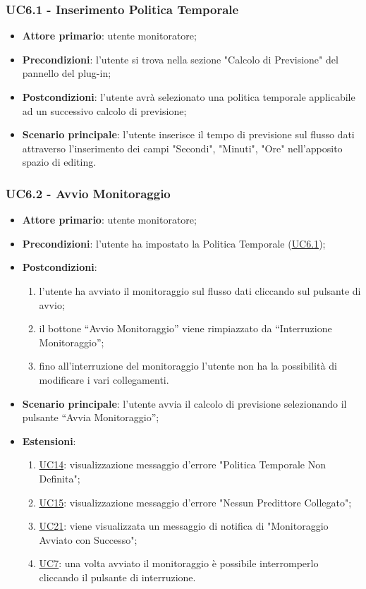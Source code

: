 	
	\label{par:UC6.1}
	\subsubsection{UC6.1 - Inserimento Politica Temporale}
		\begin{itemize}
			\item\textbf{Attore primario}: utente monitoratore;
			\item\textbf{Precondizioni}: l'utente si trova nella sezione "Calcolo di Previsione" del pannello del plug-in;
			\item\textbf{Postcondizioni}: l’utente avrà selezionato una politica temporale applicabile ad un successivo calcolo di previsione;
			\item\textbf{Scenario principale}: l’utente inserisce il tempo di previsione sul flusso dati attraverso l'inserimento dei campi "Secondi", "Minuti", "Ore" nell’apposito spazio di editing.
		\end{itemize}	

	\label{par:UC6.2}
	\subsubsection{UC6.2 - Avvio Monitoraggio}
		\begin{itemize}
			\item\textbf{Attore primario}: utente monitoratore;
			\item\textbf{Precondizioni}: l’utente ha impostato la Politica Temporale (\hyperref[par:UC6.1]{UC6.1});
			\item\textbf{Postcondizioni}:
				\begin{enumerate}
					\item l’utente ha avviato il monitoraggio sul flusso dati cliccando sul pulsante di avvio;
					\item il bottone “Avvio Monitoraggio” viene rimpiazzato da “Interruzione Monitoraggio”;
					\item fino all’interruzione del monitoraggio l’utente non ha la possibilità di modificare i vari collegamenti.
				\end{enumerate}
			\item\textbf{Scenario principale}: l’utente avvia il calcolo di previsione selezionando il pulsante “Avvia Monitoraggio”;
			\item\textbf{Estensioni}:
				\begin{enumerate}
					\item \hyperref[par:UC14]{UC14}: visualizzazione messaggio d’errore "Politica Temporale Non Definita";
					\item \hyperref[par:UC15]{UC15}: visualizzazione messaggio d’errore "Nessun Predittore Collegato";
					\item \hyperref[par:UC21]{UC21}: viene visualizzata un messaggio di notifica di "Monitoraggio Avviato con Successo";
					\item \hyperref[par:UC7]{UC7}: una volta avviato il monitoraggio è possibile interromperlo cliccando il pulsante di interruzione.
				\end{enumerate}
			
				
		\end{itemize}	

